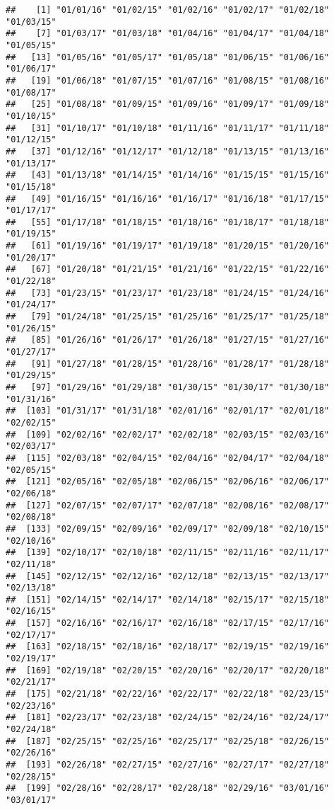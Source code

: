 \documentclass[]{article}
\begin{document}
\begin{verbatim}
##    [1] "01/01/16" "01/02/15" "01/02/16" "01/02/17" "01/02/18" "01/03/15"
##    [7] "01/03/17" "01/03/18" "01/04/16" "01/04/17" "01/04/18" "01/05/15"
##   [13] "01/05/16" "01/05/17" "01/05/18" "01/06/15" "01/06/16" "01/06/17"
##   [19] "01/06/18" "01/07/15" "01/07/16" "01/08/15" "01/08/16" "01/08/17"
##   [25] "01/08/18" "01/09/15" "01/09/16" "01/09/17" "01/09/18" "01/10/15"
##   [31] "01/10/17" "01/10/18" "01/11/16" "01/11/17" "01/11/18" "01/12/15"
##   [37] "01/12/16" "01/12/17" "01/12/18" "01/13/15" "01/13/16" "01/13/17"
##   [43] "01/13/18" "01/14/15" "01/14/16" "01/15/15" "01/15/16" "01/15/18"
##   [49] "01/16/15" "01/16/16" "01/16/17" "01/16/18" "01/17/15" "01/17/17"
##   [55] "01/17/18" "01/18/15" "01/18/16" "01/18/17" "01/18/18" "01/19/15"
##   [61] "01/19/16" "01/19/17" "01/19/18" "01/20/15" "01/20/16" "01/20/17"
##   [67] "01/20/18" "01/21/15" "01/21/16" "01/22/15" "01/22/16" "01/22/18"
##   [73] "01/23/15" "01/23/17" "01/23/18" "01/24/15" "01/24/16" "01/24/17"
##   [79] "01/24/18" "01/25/15" "01/25/16" "01/25/17" "01/25/18" "01/26/15"
##   [85] "01/26/16" "01/26/17" "01/26/18" "01/27/15" "01/27/16" "01/27/17"
##   [91] "01/27/18" "01/28/15" "01/28/16" "01/28/17" "01/28/18" "01/29/15"
##   [97] "01/29/16" "01/29/18" "01/30/15" "01/30/17" "01/30/18" "01/31/16"
##  [103] "01/31/17" "01/31/18" "02/01/16" "02/01/17" "02/01/18" "02/02/15"
##  [109] "02/02/16" "02/02/17" "02/02/18" "02/03/15" "02/03/16" "02/03/17"
##  [115] "02/03/18" "02/04/15" "02/04/16" "02/04/17" "02/04/18" "02/05/15"
##  [121] "02/05/16" "02/05/18" "02/06/15" "02/06/16" "02/06/17" "02/06/18"
##  [127] "02/07/15" "02/07/17" "02/07/18" "02/08/16" "02/08/17" "02/08/18"
##  [133] "02/09/15" "02/09/16" "02/09/17" "02/09/18" "02/10/15" "02/10/16"
##  [139] "02/10/17" "02/10/18" "02/11/15" "02/11/16" "02/11/17" "02/11/18"
##  [145] "02/12/15" "02/12/16" "02/12/18" "02/13/15" "02/13/17" "02/13/18"
##  [151] "02/14/15" "02/14/17" "02/14/18" "02/15/17" "02/15/18" "02/16/15"
##  [157] "02/16/16" "02/16/17" "02/16/18" "02/17/15" "02/17/16" "02/17/17"
##  [163] "02/18/15" "02/18/16" "02/18/17" "02/19/15" "02/19/16" "02/19/17"
##  [169] "02/19/18" "02/20/15" "02/20/16" "02/20/17" "02/20/18" "02/21/17"
##  [175] "02/21/18" "02/22/16" "02/22/17" "02/22/18" "02/23/15" "02/23/16"
##  [181] "02/23/17" "02/23/18" "02/24/15" "02/24/16" "02/24/17" "02/24/18"
##  [187] "02/25/15" "02/25/16" "02/25/17" "02/25/18" "02/26/15" "02/26/16"
##  [193] "02/26/18" "02/27/15" "02/27/16" "02/27/17" "02/27/18" "02/28/15"
##  [199] "02/28/16" "02/28/17" "02/28/18" "02/29/16" "03/01/16" "03/01/17"

\end{verbatim}
\end{document}
